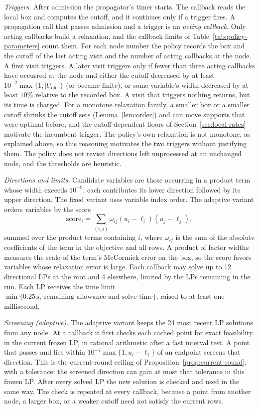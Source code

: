 \emph{Triggers.} After admission the propagator's timer starts. The
callback reads the local box and computes the cutoff, and it continues only
if a trigger
fires. A propagation call that passes admission and a trigger is an
\emph{acting callback}. Only acting callbacks build a relaxation, and the
callback limits
of Table~\ref{tab:policy-parameters} count them. For each node number the
policy records the box and the cutoff of the last acting visit and the
number of acting callbacks at the node. A first visit triggers. A later
visit triggers only if fewer than three acting callbacks have occurred at
the node and either the cutoff decreased by
at least $10^{-2}\max\{1,|U_{\mathrm{old}}|\}$ (or became finite), or some
variable's width decreased by at least $10\%$ relative to the recorded box.
A visit that triggers nothing returns, but its time is charged.
For a monotone relaxation family, a smaller box or a smaller cutoff shrinks
the cutoff sets (Lemma~\ref{lem:order}) and can move supports that were
optimal before, and the cutoff-dependent floors of
Section~\ref{sec:local-rates} motivate the incumbent trigger. The policy's
own relaxation is not monotone, as explained above, so this reasoning
motivates the two triggers without justifying them. The policy does not
revisit directions left unprocessed at an unchanged node, and the
thresholds are heuristic.

\emph{Directions and limits.} Candidate variables are those occurring in a
product term whose width exceeds $10^{-9}$; each contributes its lower
direction followed by its upper direction. The fixed variant uses variable
index order. The adaptive variant orders variables by the score
\[
 \mathrm{score}_i=\sum_{(i,j)}\omega_{ij}(u_i-\ell_i)(u_j-\ell_j),
\]
summed over the product terms containing $i$, where $\omega_{ij}$ is the sum
of the absolute coefficients of the term in the objective and all rows. A
product of factor widths measures the scale of the term's McCormick error on
the box, so the score favors variables whose relaxation error is large. Each
callback may solve up to 12 directional LPs at the root and 4 elsewhere,
limited by the LPs remaining in the run. Each LP receives the time limit
$\min\{0.25\,\mathrm{s},\ \text{remaining allowance and solve time}\}$, raised
to at least one millisecond.

\emph{Screening (adaptive).} The adaptive variant keeps the 24 most recent
LP solutions from any node. At a callback it first checks each cached point
for exact feasibility in the current frozen LP, in rational arithmetic after a
fast interval test. A point that passes and lies within
$10^{-7}\max\{1,u_i-\ell_i\}$ of an endpoint screens that direction. This is the
current-round ceiling of Proposition~\ref{prop:current-round}, with a
tolerance: the screened direction can gain at most that tolerance in this
frozen LP. After every solved LP the new solution is checked and used in the
same way. The check is repeated at every callback, because a point from another
node, a larger box, or a weaker cutoff need not satisfy the current rows.

